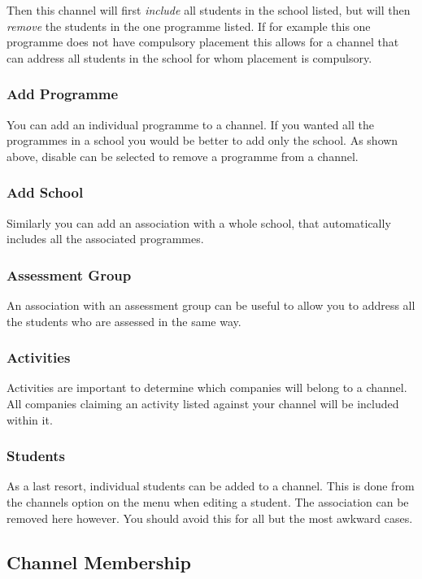 \documentclass[12 pt]{book}
\begin{document}
Then this channel will first \emph{include} all students in the school listed,
but will then \emph{remove} the students in the one programme listed. If for
example this one programme does not have compulsory placement this allows for
a channel that can address all students in the school for whom placement is
compulsory.

\subsubsection{Add Programme}

You can add an individual programme to a channel. If you wanted all the
programmes in a school you would be better to add only the school. As shown
above, disable can be selected to remove a programme from a channel.

\subsubsection{Add School}

Similarly you can add an association with a whole school, that automatically
includes all the associated programmes.

\subsubsection{Assessment Group}

An association with an assessment group can be useful to allow you to address
all the students who are assessed in the same way.

\subsubsection{Activities}

Activities are important to determine which companies will belong to a channel.
All companies claiming an activity listed against your channel will be
included within it.

\subsubsection{Students}

As a last resort, individual students can be added to a channel. This is done
from the channels option on the menu when editing a student. The association
can be removed here however. You should avoid this for all but the most
awkward cases.

\subsection{Channel Membership}
\end{document}
